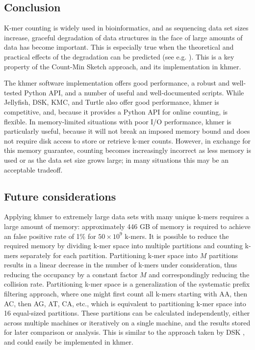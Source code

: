 \documentclass[10pt]{article}
\begin{document}
\subsection*{Conclusion}

K-mer counting is widely used in bioinformatics, and as sequencing
data set sizes increase, graceful degradation of data structures in
the face of large amounts of data has become important.  This is
especially true when the theoretical and practical effects of the
degradation can be predicted (see e.g. \cite{Melsted2011, Pell2012,
  Roy2014}).  This is a key property of the Count-Min Sketch approach,
and its implementation in khmer.

The khmer software implementation offers good performance, a robust
and well-tested Python API, and a number of useful and well-documented
scripts.  While Jellyfish, DSK, KMC, and Turtle also offer good
performance, khmer is competitive, and, because it provides a Python
API for online counting, is flexible.  In memory-limited situations
with poor I/O performance, khmer is particularly useful, because it
will not break an imposed memory bound and does not require disk
access to store or retrieve k-mer counts.  However, in exchange for
this memory guarantee, counting becomes increasingly incorrect as less
memory is used or as the data set size grows large; in many situations
this may be an acceptable tradeoff.

\subsection*{Future considerations}

Applying khmer to extremely large data sets with many unique k-mers
requires a large amount of memory: approximately 446 GB of memory is
required to achieve an false positive rate of 1\% for $50\times 10^9$
k-mers. It is possible to reduce the required memory by dividing k-mer
space into multiple partitions and counting k-mers separately for each
partition. Partitioning k-mer space into $M$ partitions results in a
linear decrease in the number of k-mers under consideration, thus
reducing the occupancy by a constant factor $M$ and correspondingly
reducing the collision rate.  Partitioning k-mer space is a
generalization of the systematic prefix filtering approach, where one
might first count all k-mers starting with AA, then AC, then AG, AT,
CA, etc., which is equivalent to partitioning k-mer space into 16
equal-sized partitions. These partitions can be calculated
independently, either across multiple machines or iteratively on a
single machine, and the results stored for later comparison or
analysis.  This is similar to the approach taken by DSK
\cite{Rizk2013}, and could easily be implemented in khmer.
\end{document}
